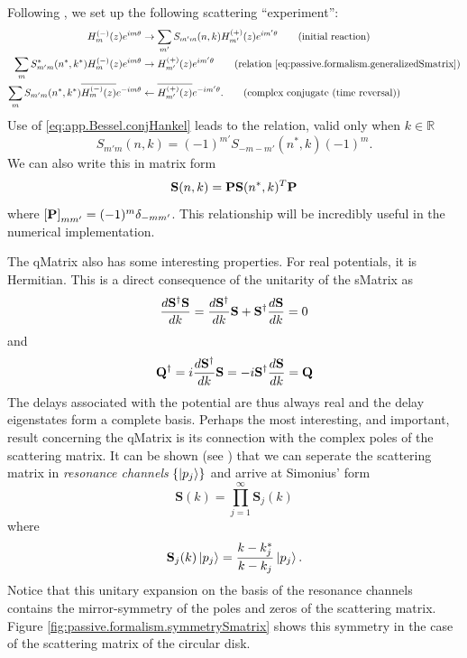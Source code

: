 Following \cite{GAP2013a}, we set up the following scattering
``experiment'':
  \begin{align*}
    H_m^{(-)}(z)e^{im\theta}					&\rightarrow \sum_{m'} S_{m'm}(n,k)H_{m'}^{(+)}(z)e^{im'\theta}	\tag{initial reaction}\\
    \sum_{m}S_{m'm}^*(n^*,k^*)H_m^{(-)}(z)e^{im\theta}		&\rightarrow H_{m'}^{(+)}(z)e^{im'\theta}			\tag{relation \eqref{eq:passive.formalism.generalizedSmatrix}}\\
    \sum_{m}S_{m'm}(n^*,k^*)\overline{H_m^{(-)}(z)}e^{-im\theta}&\leftarrow \overline{H_{m'}^{(+)}(z)}e^{-im'\theta}.		\tag{complex conjugate (time reversal)}
  \end{align*}
Use of \eqref{eq:app.Bessel.conjHankel}
leads to the relation, valid only when $k\in\mathbb{R}$
  \begin{equation}
    \label{eq:passive.formalism.timeReversalSymmetryReal}
    S_{m'm}(n,k) = (-1)^{m'}S_{-m-m'}(n^*,k)(-1)^m.
  \end{equation}
We can also write this in matrix form 
	\begin{equation}
		\mathbf{S}(n,k) = \mathbf{P}\mathbf{S}(n^*,k)^T\mathbf{P}
	\end{equation}
where $\left[\mathbf{P}\right]_{mm'} = (-1)^m\delta_{-mm'}$.
This relationship will be incredibly useful in the numerical implementation.

The \gls{qMatrix} also has some interesting properties. For real
potentials, it is Hermitian. This is a direct consequence of the
unitarity of the \gls{sMatrix} as 
  \begin{equation}
   \frac{d\mathbf{S}^\dagger\mathbf{S}}{dk} = \frac{d\mathbf{S}^\dagger}{dk}\mathbf{S}+\mathbf{S}^\dagger\frac{d\mathbf{S}}{dk} = 0
  \end{equation}
and
  \begin{equation}
   \mathbf{Q}^\dagger = i\frac{d\mathbf{S}^\dagger}{dk}\mathbf{S} = -i\mathbf{S}^\dagger\frac{d\mathbf{S}}{dk} = \mathbf{Q}
  \end{equation}
The delays associated with the potential are thus always real
and the delay eigenstates form a complete basis. Perhaps the
most interesting, and important, result concerning the 
\gls{qMatrix} is its connection with the complex poles of the
scattering matrix. It can be shown (see \cite{SHI2011,SHI2012,GAP2013a})
that we can seperate the scattering matrix in \textit{resonance channels} $\{\ket{p_j}\}$
and arrive at Simonius' form \cite{SIM1974}
  \begin{equation}
   \mathbf{S}(k)=\prod_{j=1}^\infty \mathbf{S}_j(k)
  \end{equation}
where
  \begin{equation}
   \mathbf{S}_j(k)\Ket{p_j} = \frac{k-k_j^*}{k-k_j}\Ket{p_j}.
  \end{equation}
Notice that this unitary expansion on the basis of the resonance
channels contains the mirror-symmetry of the poles and zeros of the 
scattering matrix. Figure \ref{fig:passive.formalism.symmetrySmatrix}
shows this symmetry in the case of the scattering matrix of the circular
disk. 

